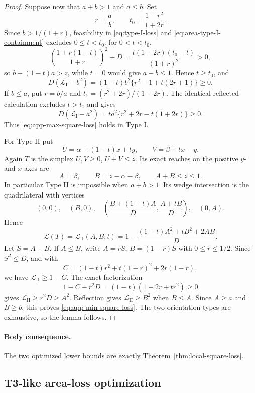 \begin{proof}
Suppose now that $a+b>1$ and $a\le b$.  Set
\[
 r=\frac ab,\qquad t_0=\frac{1-r^2}{1+2r}.
\]
Since $b>1/(1+r)$, feasibility in \eqref{eq:type-I-loss} and
\eqref{eq:area-type-I-containment} excludes
$0\le t<t_0$: for $0<t<t_0$,
\[
 \left(\frac{1+r(1-t)}{1+r}\right)^2-D
 =\frac{t(1+2r)(t_0-t)}{(1+r)^2}>0,
\]
so $b+(1-t)a>z$, while $t=0$ would give $a+b\le1$.  Hence $t\ge t_0$, and
\[
 D(\mathcal L_{\mathrm I}-b^2)
 =(1-t)b^2\{r^2-1+t(2r+1)\}\ge0.
\]
If $b\le a$, put $r=b/a$ and
$t_1=(r^2+2r)/(1+2r)$.  The identical reflected calculation excludes
$t>t_1$ and gives
\[
 D(\mathcal L_{\mathrm I}-a^2)
 =ta^2\{r^2+2r-t(1+2r)\}\ge0.
\]
Thus \eqref{eq:app-max-square-loss} holds in Type I.

For Type II put
\[
 U=\alpha+(1-t)x+ty,\qquad V=\beta+tx-y.
\]
Again $T$ is the simplex $U,V\ge0$, $U+V\le z$.  Its exact reaches on the
positive $y$- and $x$-axes are
\begin{equation}
 A=\beta,\qquad B=z-\alpha-\beta,\qquad A+B\le z\le1.
 \label{eq:area-type-II-reaches}
\end{equation}
In particular Type II is impossible when $a+b>1$.  Its wedge intersection
is the quadrilateral with vertices
\[
 (0,0),\quad(B,0),\quad
 \left(\frac{B+(1-t)A}{D},\frac{A+tB}{D}\right),
 \quad(0,A).
\]
Hence
\begin{equation}
 \mathcal L(T)=\mathcal L_{\mathrm{II}}(A,B;t)
 =1-\frac{(1-t)A^2+tB^2+2AB}{D}.              \label{eq:type-II-loss}
\end{equation}
Let $S=A+B$.  If $A\le B$, write $A=rS$, $B=(1-r)S$ with
$0\le r\le1/2$.  Since $S^2\le D$, and with
\[
 C=(1-t)r^2+t(1-r)^2+2r(1-r),
\]
we have $\mathcal L_{\mathrm{II}}\ge1-C$.  The exact factorization
\[
 1-C-r^2D=(1-t)(1-2r+tr^2)\ge0
\]
gives $\mathcal L_{\mathrm{II}}\ge r^2D\ge A^2$.  Reflection gives
$\mathcal L_{\mathrm{II}}\ge B^2$ when $B\le A$.  Since $A\ge a$ and $B\ge b$,
this proves \eqref{eq:app-min-square-loss}.  The two orientation types are
exhaustive, so the lemma follows.
\end{proof}

\paragraph{Body consequence.}
The two optimized lower bounds are exactly
Theorem~\ref{thm:local-square-loss}.

\subsection{T3-like area-loss optimization}
\label{subsec:app-t3-area-optimization}

